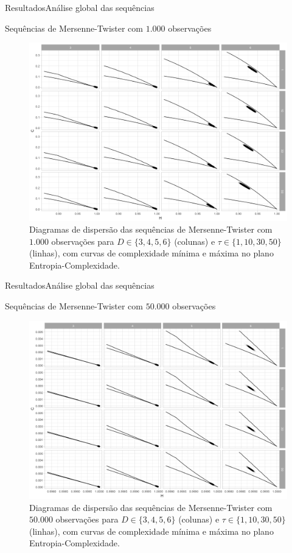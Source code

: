 \documentclass[10pt,xcolor={dvipsnames}]{beamer}
\begin{document}
\begin{frame}{Resultados}{Análise global das sequências}
\begin{block}{Sequências de Mersenne-Twister com $1.000$ observações}
	\begin{figure}[hbt]
		\centering
		\includegraphics[width=.65\linewidth]{ScatterAll_MT_1k}
		\caption{Diagramas de dispersão das sequências de Mersenne-Twister com $1.000$ observações para $D\in\{3, 4, 5, 6\}$ (colunas) e $\tau\in\{1, 10, 30, 50\}$ (linhas), com curvas de complexidade mínima e máxima no plano Entropia-Complexidade.}\label{Fig:ScatterAll_MT_1k}
	\end{figure}
\end{block}
\end{frame}

\begin{frame}{Resultados}{Análise global das sequências}
\begin{block}{Sequências de Mersenne-Twister com $50.000$ observações}
	\begin{figure}[hbt]
		\centering
		\includegraphics[width=.65\linewidth]{ScatterAll_MT_50k}
		\caption{Diagramas de dispersão das sequências de Mersenne-Twister com $50.000$ observações para $D\in\{3,4,5,6\}$ (colunas) e $\tau\in\{1,10,30,50\}$ (linhas), com curvas de complexidade mínima e máxima no plano Entropia-Complexidade.}\label{Fig:ScatterAll_MT_50k}
	\end{figure}
\end{block}
\end{frame}
\end{document}
